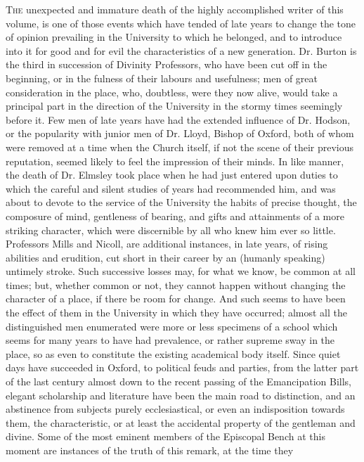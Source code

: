T\textsc{he}
unexpected and immature death of the highly accomplished writer of this
volume, is one of those events which have tended of late years to change
the tone of opinion prevailing in the University to which he belonged,
and to introduce into it for good and for evil the characteristics of a
new generation. Dr. Burton is the third in succession of Divinity
Professors, who have been cut off in the beginning, or in the fulness of
their labours and usefulness; men of great consideration in the place,
who, doubtless, were they now alive, would take a principal part in the
direction of the University in the stormy times seemingly before it. Few
men of late years have had the extended influence of Dr. Hodson, or the
popularity with junior men of Dr. Lloyd, Bishop of Oxford, both of whom
were removed at a time when the Church itself, if not the scene of their
previous reputation, seemed likely to feel the impression of their
minds. In like manner, the death of Dr. Elmsley took place when he had
just entered upon duties to which the careful and silent studies of
years had recommended him, and was about to devote to the service of the
University the habits of precise thought, the composure of mind,
gentleness of bearing, and gifts and attainments of a more striking
character, which were discernible by all who knew him ever so little.
Professors Mills and Nicoll, are additional instances, in late years, of
rising abilities and erudition, cut short in their career by an (humanly
speaking) untimely stroke. Such successive losses may, for what we know,
be common at all times; but, whether common or not, they cannot happen
without changing the character of a place, if there be room for change.
And such seems to have been the effect of them in the University in
which they have occurred; almost all the distinguished men enumerated
were more or less specimens of a school which seems for many years to
have had prevalence, or rather supreme sway in the place, so as even to
constitute the existing academical body itself. Since quiet days have
succeeded in Oxford, to political feuds and parties, from the latter
part of the last century almost down to the recent passing of the
Emancipation Bills, elegant scholarship and literature have been the
main road to distinction, and an abstinence from subjects purely
ecclesiastical, or even an indisposition towards them, the
characteristic, or at least the accidental property of the gentleman and
divine. Some of the most eminent members of the Episcopal Bench at this
moment are instances of the truth of this remark, at the time they
